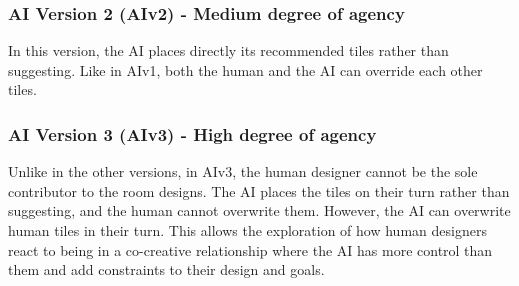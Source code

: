 


\subsubsection{AI Version 2 (AIv2) - Medium degree of agency} 

In this version, the AI places directly its recommended tiles rather than suggesting. Like in AIv1, both the human and the AI can override each other tiles.



\subsubsection{AI Version 3 (AIv3) - High degree of agency} 

Unlike in the other versions, in AIv3, the human designer cannot be the sole contributor to the room designs. The AI places the tiles on their turn rather than suggesting, and the human cannot overwrite them. However, the AI can overwrite human tiles in their turn. This allows the exploration of how human designers react to being in a co-creative relationship where the AI has more control than them and add constraints to their design and goals.


